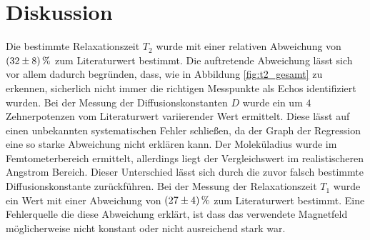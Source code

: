\newpage
\section{Diskussion}
\label{sec:Diskussion}

Die bestimmte Relaxationszeit $T_{2}$ wurde mit einer relativen Abweichung von $\SI{32+-8}{\percent}$ zum Literaturwert bestimmt.
Die auftretende Abweichung lässt sich vor allem dadurch begründen, dass, wie in Abbildung \ref{fig:t2_gesamt}
zu erkennen, sicherlich nicht immer die richtigen Messpunkte als Echos identifiziert wurden.
Bei der Messung der Diffusionskonstanten $D$ wurde ein um $4$ Zehnerpotenzen vom Literaturwert variierender Wert ermittelt.
Diese lässt auf einen unbekannten systematischen Fehler schließen, da der Graph der Regression eine so starke Abweichung nicht erklären kann.
Der Moleküladius wurde im Femtometerbereich ermittelt, allerdings liegt der Vergleichswert im realistischeren Angstrom Bereich.
Dieser Unterschied lässt sich durch die zuvor falsch bestimmte Diffusionskonstante zurückführen.
Bei der Messung der Relaxationszeit $T_{1}$ wurde ein Wert mit einer Abweichung von $\SI{27+-4}{\percent}$ zum Literaturwert bestimmt.
Eine Fehlerquelle die diese Abweichung erklärt,
ist dass das verwendete Magnetfeld möglicherweise nicht konstant oder nicht ausreichend stark war.
